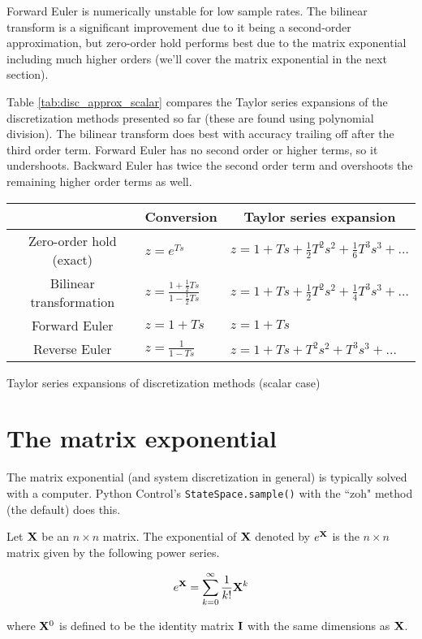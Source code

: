 Forward Euler is numerically unstable for low sample rates. The bilinear
transform is a significant improvement due to it being a second-order
approximation, but zero-order hold performs best due to the matrix exponential
including much higher orders (we'll cover the matrix exponential in the next
section).

Table \ref{tab:disc_approx_scalar} compares the Taylor series expansions of the
discretization methods presented so far (these are found using polynomial
division). The bilinear transform does best with accuracy trailing off after the
third order term. Forward Euler has no second order or higher terms, so it
undershoots. Backward Euler has twice the second order term and overshoots the
remaining higher order terms as well.

\begin{booktable}
  \begin{tabular}{|cll|}
    \hline
    \rowcolor{headingbg}
    \multicolumn{1}{|c}{\textbf{Discretization method}} &
      \multicolumn{1}{c}{\textbf{Conversion}} &
      \multicolumn{1}{c|}{\textbf{Taylor series expansion}} \\
    \hline
    Zero-order hold (exact) &
      $z = e^{Ts}$ &
      $z = 1 + Ts + \frac{1}{2}T^2s^2 + \frac{1}{6}T^3s^3 + \ldots$ \\
    Bilinear transformation &
      $z = \frac{1 + \frac{1}{2}Ts}{1 - \frac{1}{2}Ts}$ &
      $z = 1 + Ts + \frac{1}{2}T^2s^2 + \frac{1}{4}T^3s^3 + \ldots$ \\
    Forward Euler &
      $z = 1 + Ts$ &
      $z = 1 + Ts$ \\
    Reverse Euler &
      $z = \frac{1}{1 - Ts}$ &
      $z = 1 + Ts + T^2s^2 + T^3s^3 + \ldots$ \\
    \hline
  \end{tabular}
  \caption{Taylor series expansions of discretization methods (scalar case)}
  \label{tab:disc_approx_scalar}
\end{booktable}

\section{The matrix exponential}

The matrix exponential (and system discretization in general) is typically
solved with a computer. Python Control's \texttt{StateSpace.sample()} with the
``zoh" method (the default) does this.

\begin{definition}
  Let $\mathbf{X}$ be an $n \times n$ matrix. The exponential of $\mathbf{X}$ denoted
  by $e^{\mathbf{X}}$ is the $n \times n$ matrix given by the following power
  series.

  \begin{equation}
    e^{\mathbf{X}} = \sum_{k=0}^\infty \frac{1}{k!} \mathbf{X}^k \label{eq:mat_exp}
  \end{equation}

  where $\mathbf{X}^0$ is defined to be the identity matrix $\mathbf{I}$ with the same
  dimensions as $\mathbf{X}$.
\end{definition}


